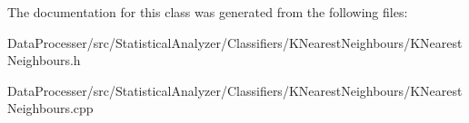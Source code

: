 The documentation for this class was generated from the following files\+:\begin{DoxyCompactItemize}
\item 
Data\+Processer/src/\+Statistical\+Analyzer/\+Classifiers/\+K\+Nearest\+Neighbours/K\+Nearest\+Neighbours.\+h\item 
Data\+Processer/src/\+Statistical\+Analyzer/\+Classifiers/\+K\+Nearest\+Neighbours/K\+Nearest\+Neighbours.\+cpp\end{DoxyCompactItemize}
